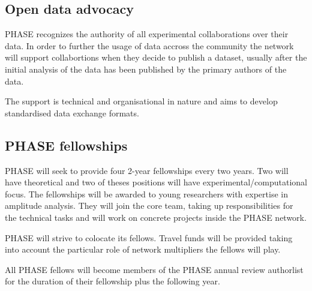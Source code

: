 \subsection{Open data advocacy}
\label{sec:opendata}
PHASE recognizes the authority of all experimental collaborations over their data. In order to further the usage of data accross the community the network will support collabortions when they decide to publish a dataset, usually after the initial analysis of the data has been published by the primary authors of the data. 

The support is technical and organisational in nature and aims to develop standardised data exchange formats.  


\subsection{PHASE fellowships}
\label{sec:fellowships}
PHASE will seek to provide four 2-year fellowships every two years. Two will have theoretical and two of theses positions will have experimental/computational focus. The fellowships will be awarded to young researchers with expertise in amplitude analysis. They will join the core team, taking up responsibilities for the technical tasks and will work on concrete projects inside the PHASE network. 

PHASE will strive to colocate its fellows. Travel funds will be provided taking into account the particular role of network multipliers the fellows will play.

All PHASE fellows will become members of the PHASE annual review authorlist for the duration of their fellowship plus the following year.     
